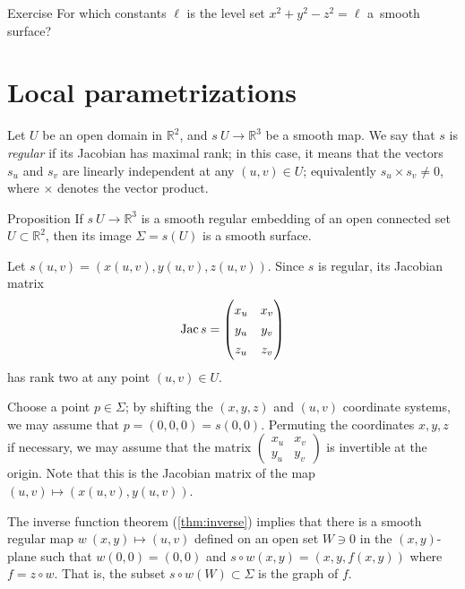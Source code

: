 \begin{thm}{Exercise}\label{ex:hyperboloids}
For which constants $\ell$ is the level set $x^2+y^2-z^2=\ell$
a~smooth surface?
\end{thm}

\section{Local parametrizations}

Let $U$ be an open domain in $\mathbb{R}^2$, and $s\:U\to \mathbb{R}^3$ be a smooth map.
We say that $s$ is \emph{regular} if its Jacobian has maximal rank;
in this case, it means that the vectors $s_u$ and $s_v$ are linearly independent at any $(u,v)\in U$;
equivalently $s_u\times s_v\ne 0$, where $\times$ denotes the vector product.

\begin{thm}{Proposition}\label{prop:graph-chart}
If $s\:U\to \mathbb{R}^3$ is a smooth regular embedding of an open connected set $U\subset \mathbb{R}^2$, then its image $\Sigma=s(U)$ is a smooth surface.
\end{thm}

Let $s(u,v)=(x(u,v),y(u,v),z(u,v))$.
Since $s$ is regular, its Jacobian matrix
\[\Jac s=
\renewcommand\arraystretch{1.3}
\begin{pmatrix}
x_u&x_v\\
y_u&y_v\\
z_u&z_v
\end{pmatrix}
\]
has rank two at any point $(u,v)\in U$.

Choose a point $p\in \Sigma$; by shifting the $(x,y,z)$ and $(u,v)$ coordinate systems, we may assume that $p = (0,0, 0) =s(0,0)$.
Permuting the coordinates $x,y,z$ if necessary, we may assume that 
the matrix $\left(\begin{smallmatrix}
x_u&x_v\\
y_u&y_v
\end{smallmatrix}\right)$
is invertible at the origin.
Note that this is the Jacobian matrix of the map $(u,v)\mapsto (x(u,v),y(u,v))$.

The inverse function theorem (\ref{thm:inverse}) implies that there is a smooth regular map
$w\:(x,y)\mapsto (u,v)$ defined on an open set $W\ni 0$ in the $(x,y)$-plane
such that $w(0,0)=(0,0)$ and  $s\circ w(x,y)=(x,y,f(x,y))$ where $f=z\circ w$.
That is, the subset $s\circ w(W)\subset \Sigma$ is 
the graph of $f$.

